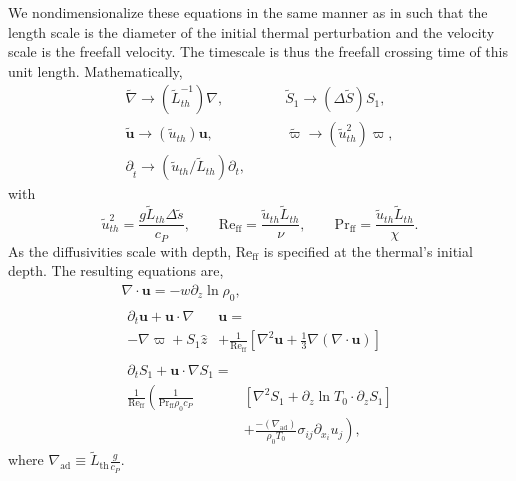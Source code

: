 \documentclass[twocolumn, amsmath, amsfonts, amssymb, trackchanges]{aastex62}
\newcommand{\DivU}{\ensuremath{\nabla\cdot\bm{u}}}
\newcommand{\td}[1]{\ensuremath{\widetilde{#1}}}
\newcommand{\grad}{\ensuremath{\nabla}}
\begin{document}
We nondimensionalize these equations in the same manner as in \citet{lecoanet&jeevanjee2018} such that the length scale is the diameter of the initial thermal perturbation and the velocity scale is the freefall velocity. 
The timescale is thus the freefall crossing time of this unit length. 
Mathematically,
\begin{equation}
\begin{split}
\td{\grad}\rightarrow(\td{L}_{th}^{-1})\grad, \qquad&
\td{S}_1 \rightarrow(\Delta\td{S})S_1,\\
\td{\bm{u}} \rightarrow (\td{u}_{th})\bm{u}, \qquad&
\td{\varpi} \rightarrow (\td{u}_{th}^2)\varpi,\\
\partial_{\tilde{t}} \rightarrow (\td{u}_{th}/\td{L}_{th})\partial_t,\qquad&
\end{split}
\end{equation}
with
\begin{equation}
\tilde{u}_{th}^2 = \frac{g \tilde{L}_{th} \Delta \tilde{s}}{c_P}, \qquad
\text{Re}_{\text{ff}} = \frac{\tilde{u}_{th} \tilde{L}_{th}}{\nu}, \qquad
\text{Pr}_{\text{ff}} = \frac{\tilde{u}_{th} \tilde{L}_{th}}{\chi}.
\end{equation}
As the diffusivities scale with depth, Re$_{\text{ff}}$ is specified at the thermal's initial depth.
The resulting equations are,
\begin{gather}
\DivU = -w \partial_z \ln\rho_0, \\
\begin{split}
\partial_t \bm{u} + \bm{u}\cdot\grad&\bm{u} = \\
- \grad \varpi + S_1\hat{z} &
+ \frac{1}{\text{Re}_{\text{ff}}}\left[\grad^2 \bm{u} + \frac{1}{3}\grad(\DivU)\right] 
\end{split}\\
\begin{split}
\partial_t S_1 + \bm{u}\cdot\grad S_1 =& \\
\frac{1}{\text{Re}_{\text{ff}}}\left(\frac{1}{\text{Pr}_{\text{ff}}\rho_0c_P }\right.&[\grad^2 S_1 + \partial_z\ln T_0 \cdot\partial_z S_1]\\
&+ \left.\frac{-(\grad_{\text{ad}})}{\rho_0 T_0}\sigma_{ij}\partial_{x_i}u_j \right),
\end{split}
\end{gather}
where $\grad_{\text{ad}} \equiv \tilde{L}_{\text{th}} \frac{g}{c_P}$. 
\end{document}
